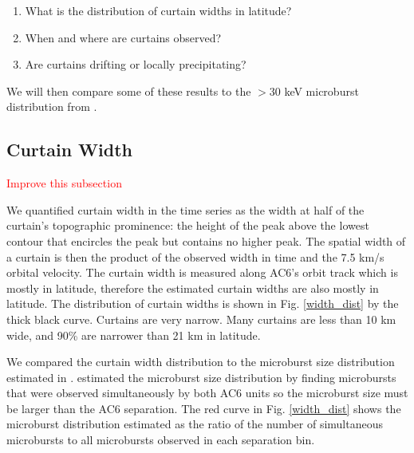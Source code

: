 \documentclass[draft]{agujournal2019}
\begin{document}
\begin{enumerate}
\item What is the distribution of curtain widths in latitude?
\item When and where are curtains observed?
\item Are curtains drifting or locally precipitating?
\end{enumerate} We will then compare some of these results to the $>30$ keV microburst distribution from .

\subsection{Curtain Width}

\textcolor{red}{Improve this subsection}

We quantified curtain width in the time series as the width at half of the curtain's topographic prominence: the height of the peak above the lowest contour that encircles the peak but contains no higher peak. The spatial width of a curtain is then the product of the observed width in time and the 7.5 km/s orbital velocity. The curtain width is measured along AC6's orbit track which is mostly in latitude, therefore the estimated curtain widths are also mostly in latitude. The distribution of curtain widths is shown in Fig. \ref{width_dist} by the thick black curve. Curtains are very narrow. Many curtains are less than 10 km wide, and 90\% are narrower than 21 km in latitude.
	
We compared the curtain width distribution to the microburst size distribution estimated in .  estimated the microburst size distribution by finding microbursts that were observed simultaneously by both AC6 units so the microburst size must be larger than the AC6 separation. The red curve in Fig. \ref{width_dist} shows the microburst distribution estimated as the ratio of the number of simultaneous microbursts to all microbursts observed in each separation bin. 
\end{document}
